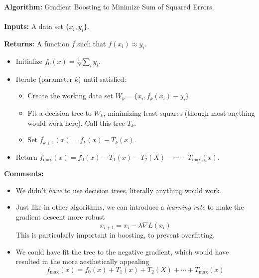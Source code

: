%
\begin{frame}
\textbf{Algorithm:} Gradient Boosting to Minimize Sum of Squared Errors.\\~\\

\textbf{Inputs:} A data set $\{ x_i, y_i \}$.

\textbf{Returns:} A function $f$ such that $f(x_i) \approx y_i$.

\begin{itemize}
  \item Initialize $f_0(x) = \frac{1}{N} \sum_i y_i$.
  \item Iterate (parameter $k$) until satisfied: \begin{itemize}
    \item Create the working data set $W_k = \{ x_i, f_k(x_i) - y_i \}$.
    \item Fit a decision tree to $W_k$, minimizing least squares (though most anything would work here).  Call this tree $T_k$.
    \item Set $f_{k+1}(x) = f_{k}(x) - T_{k}(x)$. 
  \end{itemize}
  \item Return $f_{\text{max}}(x) = f_0(x) - T_1(x) - T_2(X) - \cdots - T_{\text{max}}(x)$.
\end{itemize}
\end{frame}
%
\begin{frame}
\textbf{Comments:}

\begin{itemize}
  \item We didn't \textit{have} to use decision trees, literally anything would work.
  \item Just like in other algorithms, we can introduce a \textit{learning rate} to make the gradient descent more robust
  $$ x_{i+1} = x_i - \lambda \nabla L(x_i) $$
This is particularly important in boosting, to prevent overfitting.
  \item We could have fit the tree to the negative gradient, which would have resulted in the more aesthetically appealing
  $$ f_{\text{max}}(x) = f_0(x) + T_1(x) + T_2(X) + \cdots + T_{\text{max}}(x) $$
\end{itemize}

\end{frame}




